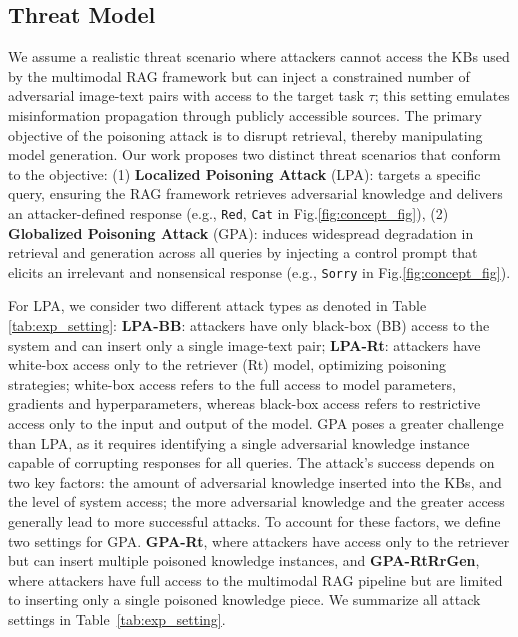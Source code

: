 \subsection{Threat Model}
\label{sec:threat_scenario}

We assume a realistic threat scenario where attackers cannot access the KBs used by the multimodal RAG framework but can inject a constrained number of adversarial image-text pairs with access to the target task $\tau$; this setting emulates misinformation propagation through publicly accessible sources. The primary objective of the poisoning attack is to disrupt retrieval, thereby manipulating model generation. Our work proposes two distinct threat scenarios that conform to the objective:
(1) \textbf{Localized Poisoning Attack} (LPA): targets a specific query, ensuring the RAG framework retrieves adversarial knowledge and delivers an attacker-defined response (e.g., \texttt{Red}, \texttt{Cat} in Fig.\ref{fig:concept_fig}), 
(2) \textbf{Globalized Poisoning Attack} (GPA): induces widespread degradation in retrieval and generation across all queries by injecting a control prompt that elicits an irrelevant and nonsensical response (e.g., \texttt{Sorry} in Fig.\ref{fig:concept_fig}).

For LPA, we consider two different attack types as denoted in Table \ref{tab:exp_setting}: \textbf{LPA-BB}: attackers have only black-box (BB) access to the system and can insert only a single image-text pair; \textbf{LPA-Rt}: attackers have white-box access only to the retriever (Rt) model, optimizing poisoning strategies; white-box access refers to the full access to model parameters, gradients and hyperparameters, whereas black-box access refers to restrictive access only to the input and output of the model. 
GPA poses a greater challenge than LPA, as it requires identifying a single adversarial knowledge instance capable of corrupting responses for all queries. The attack's success depends on two key factors: the amount of adversarial knowledge inserted into the KBs, and the level of system access; the more adversarial knowledge and the greater access generally lead to more successful attacks. To account for these factors, we define two settings for GPA. \textbf{GPA-Rt}, where attackers have access only to the retriever but can insert multiple poisoned knowledge instances, and \textbf{GPA-RtRrGen}, where attackers have full access to the multimodal RAG pipeline but are limited to inserting only a single poisoned knowledge piece. We summarize all attack settings in Table~\ref{tab:exp_setting}.

